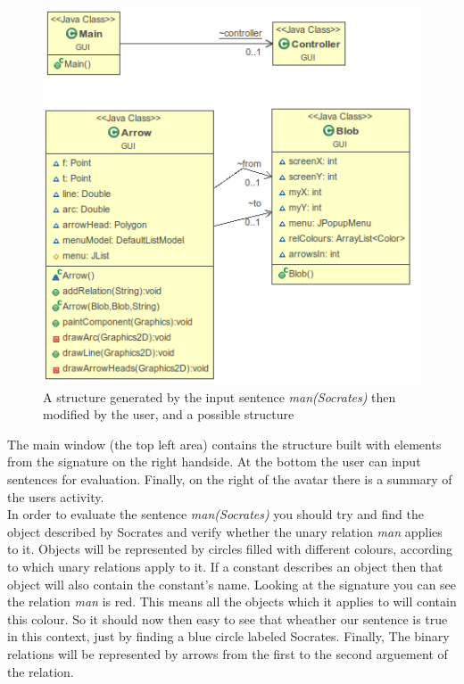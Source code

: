 \documentclass{article}
\begin{document}
\begin{figure}[h]
\centering
\includegraphics[width=\textwidth]{gui.png}
\caption{A structure generated by the input sentence \emph{man(Socrates)} then modified by the user, and a possible structure}
\end{figure}

\noindent The main window (the top left area) contains the structure built with elements from the signature on the right handside. At the bottom the user can input sentences for evaluation. Finally, on the right of the avatar there is a summary of the users activity.\\

\noindent In order to evaluate the sentence \emph{man(Socrates)} you should try and find the object described by Socrates and verify whether the unary relation \emph{man} applies to it. Objects will be represented by circles filled with different colours, according to which unary relations apply to it. If a constant describes an object then that object will also contain the constant's name. Looking at the signature you can see the relation \emph{man} is red. This means all the objects which it applies to will contain this colour. So it should now then easy to see that wheather our sentence is true in this context, just by finding a blue circle labeled Socrates. Finally, The binary relations will be represented by arrows from the first to the second arguement of the relation.
\end{document}
